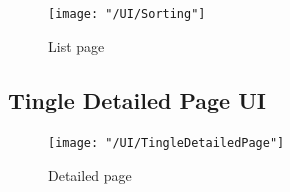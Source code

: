\documentclass{article} %
\begin{document}
\begin{figure}[h!]
	\centering
	\texttt{[image: "/UI/Sorting"]}
	\caption{List page}
	\label{fig:listpage}
\end{figure}

\newpage

\subsection{Tingle Detailed Page UI} \label{App:AppendixA10}

\begin{figure}[h!]
	\centering
	\texttt{[image: "/UI/TingleDetailedPage"]}
	\caption{Detailed page}
	\label{fig:detailpage}
\end{figure}


	
\end{document}
